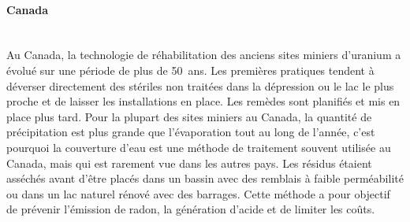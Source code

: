 \documentclass{article}
\begin{document}
\paragraph{Canada \\ \\}
Au Canada, la technologie de réhabilitation des anciens sites miniers d'uranium a évolué sur une période de plus de 50~ans. Les premières pratiques tendent à déverser directement des stériles non traitées dans la dépression ou le lac le plus proche et de laisser les installations en place. Les remèdes sont planifiés et mis en place plus tard.%
Pour la plupart des sites miniers au Canada, la quantité de précipitation est plus grande que l'évaporation tout au long de l'année, c’est pourquoi la couverture d’eau est une méthode de traitement souvent utilisée au Canada, mais qui est rarement vue dans les autres pays.%
Les résidus étaient asséchés avant d'être placés dans un bassin avec des remblais à faible perméabilité ou dans un lac naturel rénové avec des barrages. Cette méthode a pour objectif de prévenir l’émission de radon, la génération d’acide et de limiter les coûts.
\end{document}

